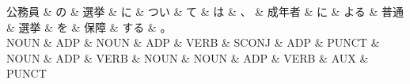 \documentclass[tikz,border=5pt]{standalone}
\begin{document}
\normalsize
\begin{dependency}[edge unit distance=12.0pt]
    \begin{deptext}[column sep=1em]
        公務員 \& の \& 選挙 \& に \& つい \& て \& は \& 、 \& 成年者 \& に \& よる \& 普通 \& 選挙 \& を \& 保障 \& する \& 。\\
        NOUN \& ADP \& NOUN \& ADP \& VERB \& SCONJ \& ADP \& PUNCT \& NOUN \& ADP \& VERB \& NOUN \& NOUN \& ADP \& VERB \& AUX \& PUNCT\\
    \end{deptext}
\end{dependency}
\end{document}
